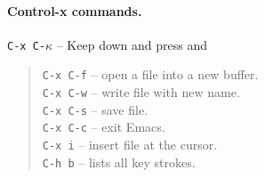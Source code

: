 \documentclass[a4paper,12pt]{book}
\begin{document}
\paragraph{Control-x commands.} \verb|C-x C-|$\kappa$ -- Keep 
down and press  and  \keys{$\kappa$}
\begin{quote}
  \verb|C-x C-f| -- open a file into a new buffer.\\
  \verb|C-x C-w| -- write file with new name.\\
\verb|C-x C-s| -- save file.\\
\verb|C-x C-c| -- exit Emacs.\\
\verb|C-x i| -- insert file at the cursor.\\
\verb|C-h b| -- lists all key strokes.\\
\end{quote}
\end{document}
